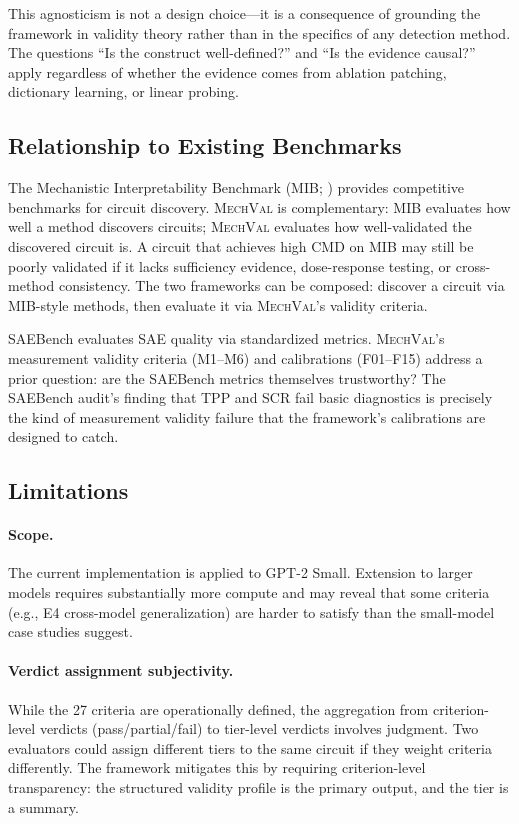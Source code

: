 \documentclass[10pt]{article}
\newcommand{\mechval}{\textsc{MechVal}}
\newcommand{\eg}{e.g.}
\begin{document}
This agnosticism is not a design choice---it is a consequence of grounding the framework in validity theory rather than in the specifics of any detection method. The questions ``Is the construct well-defined?'' and ``Is the evidence causal?'' apply regardless of whether the evidence comes from ablation patching, dictionary learning, or linear probing.

\subsection{Relationship to Existing Benchmarks}

The Mechanistic Interpretability Benchmark (MIB; \citealp{mueller2025mib}) provides competitive benchmarks for circuit discovery. \mechval{} is complementary: MIB evaluates how well a method discovers circuits; \mechval{} evaluates how well-validated the discovered circuit is. A circuit that achieves high CMD on MIB may still be poorly validated if it lacks sufficiency evidence, dose-response testing, or cross-method consistency. The two frameworks can be composed: discover a circuit via MIB-style methods, then evaluate it via \mechval{}'s validity criteria.

SAEBench evaluates SAE quality via standardized metrics. \mechval{}'s measurement validity criteria (M1--M6) and calibrations (F01--F15) address a prior question: are the SAEBench metrics themselves trustworthy? The SAEBench audit's finding that TPP and SCR fail basic diagnostics is precisely the kind of measurement validity failure that the framework's calibrations are designed to catch.

\subsection{Limitations}

\paragraph{Scope.} The current implementation is applied to GPT-2 Small. Extension to larger models requires substantially more compute and may reveal that some criteria (\eg, E4 cross-model generalization) are harder to satisfy than the small-model case studies suggest.

\paragraph{Verdict assignment subjectivity.} While the 27 criteria are operationally defined, the aggregation from criterion-level verdicts (pass/partial/fail) to tier-level verdicts involves judgment. Two evaluators could assign different tiers to the same circuit if they weight criteria differently. The framework mitigates this by requiring criterion-level transparency: the structured validity profile is the primary output, and the tier is a summary.
\end{document}
